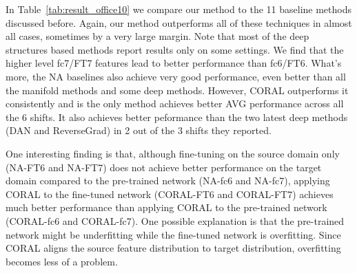 \documentclass[letterpaper]{article}
\begin{document}
\begin{table}[t]
\centering
{}
\caption{\small Review classification accuracies of the 4 standard domain shifts~\cite{gong-icml13} on the Amazon dataset~\cite{Blitzer07Biographies} with bag-of-words features.}
\label{tab:result_nlp}
\end{table}

In Table~\ref{tab:result_office10} we compare our method to the 11 baseline methods discussed before. Again, our method outperforms all of these techniques in almost all cases, sometimes by a very large margin. Note that most of the deep structures based methods report results only on some settings. We find that the higher level fc7/FT7 features lead to better performance than fc6/FT6. What's more, the NA baselines also achieve very good performance, even better than all the manifold methods and some deep methods. However, CORAL outperforms it consistently and is the only method achieves better AVG performance across all the 6 shifts. It also achieves better peformance than the two latest deep methods (DAN and ReverseGrad) in 2 out of the 3 shifts they reported.

One interesting finding is that, although fine-tuning on the source domain only (NA-FT6 and NA-FT7) does not achieve better performance on the target domain compared to the pre-trained network (NA-fc6 and NA-fc7), applying CORAL to the fine-tuned network (CORAL-FT6 and CORAL-FT7) achieves much better performance than applying CORAL to the pre-trained network (CORAL-fc6 and CORAL-fc7). One possible explanation is that the pre-trained network might be underfitting while the fine-tuned network is overfitting. Since CORAL aligns the source feature distribution to target distribution, overfitting becomes less of a problem.
\end{document}
